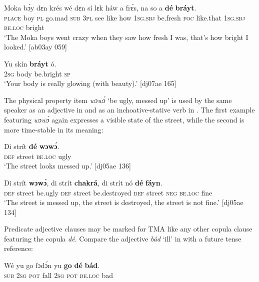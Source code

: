 \ea%
    \label{ex:key:832}
    \gll Moka  bɔ́y  dɛn  krés    wé  dɛn  sí  lɛk  háw    a    frɛ́s,  
na  so    a    \textbf{dé}    \textbf{bráyt}.\\
\textsc{place}  boy  \textsc{pl}  go.mad  \textsc{sub}  \textsc{3pl}  see  like  how    \textsc{1sg.sbj}  be.fresh  
\textsc{foc}  like.that  \textsc{1sg.sbj}  \textsc{be.loc}  bright\\

\glt ‘The Moka boys went crazy when they saw how fresh I was, that’s how bright 
I looked.’ [ab03ay 059]
\z


\ea%
    \label{ex:key:833}
    \gll Yu  skín    \textbf{bráyt}    ó.\\
\textsc{2sg}  body  be.bright    \textsc{sp}\\

\glt ‘Your body is really glowing (with beauty).’ [dj07ae 165]
\z

The physical property item \textit{wɔwɔ́} ‘be ugly, messed up’ is used by the same speaker as an adjective in  and as an inchoative-stative verb in . The first example featuring \textit{wɔwɔ́} again expresses a visible state of the street, while the second is more time-stable in its meaning: 


\ea%
    \label{ex:key:834}
    \gll Di  strít    \textbf{dé}   \textbf{wɔwɔ́}.\\
\textsc{def}  street  \textsc{be.loc}  ugly\\

\glt ‘The street looks messed up.’ [dj05ae 136]
\z


\ea%
    \label{ex:key:835}
    \gll Di  strít    \textbf{wɔwɔ́},  di  strít    \textbf{chakrá},      
di  strít    nó  \textbf{dé}    \textbf{fáyn}.\\
\textsc{def}  street  be.ugly  \textsc{def}  street  be.destroyed    
\textsc{def}  street  \textsc{neg}  \textsc{be.loc}  fine\\

\glt ‘The street is messed up, the street is destroyed, the street is not fine.’ [dj05ae 134]
\z

Predicate adjective clauses may be marked for \textsc{TMA} like any other copula clause featuring the copula \textit{dé}. Compare the adjective \textit{bád} ‘ill’ in  with a future tense reference:


\ea%
    \label{ex:key:836}
    \gll Wé  yu  go  fɔdɔ́n  yu  \textbf{go}  \textbf{dé}    \textbf{bád}.\\
\textsc{sub}  \textsc{2sg}  \textsc{pot}  fall    \textsc{2sg}  \textsc{pot}  \textsc{be.loc}  bad\\

